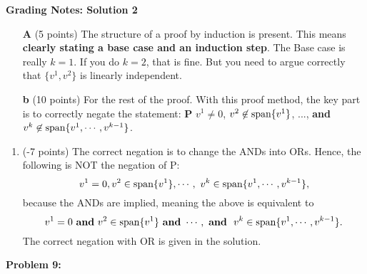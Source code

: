 \documentclass[letterpaper]{article}
\begin{document}
\vspace*{2cm}

\noindent \textbf{Grading Notes: Solution 2}
\begin{itemize}
\item[\bf A] (5 points) The structure of a proof by induction is present. This means \textbf{clearly stating a base case and an induction step}. The Base case is really $k=1$. If you do $k=2$, that is fine. But you need to argue correctly that $\{v^1, v^2\}$ is linearly independent.
\item[\bf b] (10 points) For the rest of the proof. With this proof method, the key part is to correctly negate the statement: \textbf{P} $v^1 \not = 0$, $v^2 \not \in \textrm{span} \{ v^1 \}$, $...$,  \textbf{and} $v^k\not \in \textrm{span} \{ v^1, \cdots, v^{k-1} \}$.

\end{itemize}

\begin{enumerate}

\item (-7 points) The correct negation is to change the ANDs into ORs. Hence, the following is NOT the negation of P:
$$v^1=0, v^2\in \textrm{span} \{ v^1 \}, \cdots, ~v^k \in \textrm{span} \{ v^1, \cdots, v^{k-1} \},$$
because the ANDs are implied, meaning the above is equivalent to
$$v^1=0 ~\text{\bf and}~ v^2\in \textrm{span} \{ v^1 \}~\text{\bf and}~  \cdots, ~\text{\bf and}~~v^k \in \textrm{span} \{ v^1, \cdots, v^{k-1} \}.$$
The correct negation with OR is given in the solution.
\end{enumerate}
\newpage

\noindent \textbf{Problem 9:}
\end{document}
